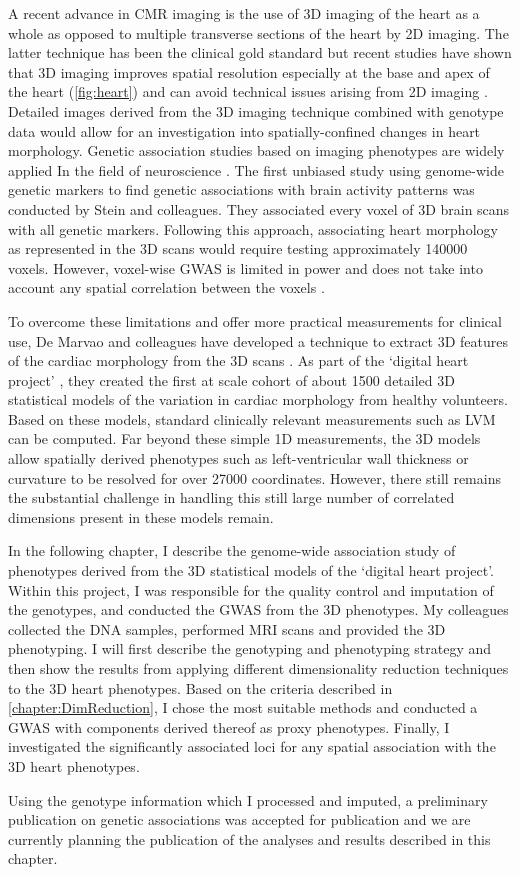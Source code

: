 A recent advance in CMR imaging is the use of 3D imaging of the heart as a whole as opposed to multiple transverse sections of the heart by 2D imaging. The latter technique has been the clinical gold standard but recent studies have shown that 3D imaging improves spatial resolution especially at the base and apex of the heart (\cref{fig:heart}) and can avoid technical issues arising from 2D imaging \citep{deMarvao2014}. Detailed images derived from the 3D imaging technique combined with genotype data would allow for an investigation into spatially-confined changes in heart morphology. Genetic association studies based on imaging phenotypes are widely applied In the field of neuroscience \citep{Filippini2009,Ho2010,Jahanshad2013,Hibar2015}. The first unbiased study using genome-wide genetic markers to find genetic associations with brain activity patterns was conducted by Stein and colleagues. They associated every voxel of 3D brain scans with all genetic markers. Following this approach, associating heart morphology as represented in the 3D scans would require testing approximately \num{140000} voxels. However, voxel-wise GWAS is limited in power and does not take into account any spatial correlation between the voxels \citep{Ge2014}. 

To overcome these limitations and offer more practical measurements for clinical use, De Marvao and colleagues have developed a technique to extract 3D features of the cardiac morphology from the 3D scans \citep{deMarvao2014}. As part of the `digital heart project' \citep{Cook2010}, they created the first at scale cohort of about \num{1500} detailed 3D statistical models of the variation in cardiac morphology from healthy volunteers. Based on these models, standard clinically relevant measurements such as LVM can be computed. Far beyond these simple 1D measurements, the 3D models allow spatially derived phenotypes such as left-ventricular wall thickness or curvature to be resolved for over \num{27000} coordinates. However, there still remains the substantial challenge in handling this still large number of correlated dimensions present in these models remain.

In the following chapter, I describe the genome-wide association study of phenotypes derived from the 3D statistical models of the `digital heart project'. Within this project, I was responsible for the quality control and imputation of the genotypes, and conducted the GWAS from the 3D phenotypes. My colleagues collected the DNA samples, performed MRI scans and provided the 3D phenotyping. I will first describe the genotyping and phenotyping strategy and then show the results from applying different dimensionality reduction techniques to the 3D heart phenotypes. Based on the criteria described in \cref{chapter:DimReduction}, I chose the most suitable methods and conducted a GWAS with components derived thereof as proxy phenotypes. Finally, I investigated the significantly associated loci for any spatial association with the 3D heart phenotypes.

Using the genotype information which I processed and imputed, a preliminary publication on genetic associations was accepted for publication \citep{Biffi2017} and we are currently planning the publication of the analyses and results described in this chapter.


